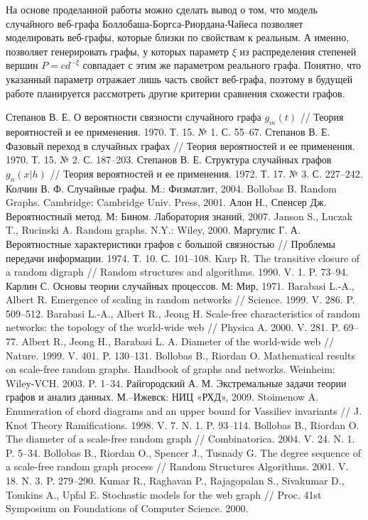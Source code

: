 \documentclass[14pt]{extreport}
\begin{document}
На основе проделанной работы можно сделать вывод о том, что модель случайного веб-графа Боллобаша-Боргса-Риордана-Чайеса позволяет моделировать веб-графы, которые близки по свойствам к реальным. А именно, позволяет генерировать графы, у которых параметр $\xi$ из распределения степеней вершин $P = c d^{-\xi}$ совпадает с этим же параметром реального графа. Понятно, что указанный параметр отражает лишь часть свойст веб-графа, поэтому в будущей работе планируется рассмотреть другие критерии сравнения схожести графов.


\begin{thebibliography}{9}

\bibitem{}
Степанов В. Е. О вероятности связности случайного графа $g_m(t)$ // Теория вероятностей и ее применения. 1970. Т. 15. № 1. С. 55–67.
\bibitem{}
Степанов В. Е. Фазовый переход в случайных графах // Теория вероятностей и ее применения. 1970. Т. 15. № 2. С. 187–203.
\bibitem{}
Степанов В. Е. Структура случайных графов $g_n(x|h)$ // Теория вероятностей и ее применения. 1972. Т. 17. № 3. С. 227–242.
\bibitem{}
Колчин В. Ф. Случайные графы. М.: Физматлит, 2004.
\bibitem{}
Bollobas B. Random Graphs. Cambridge: Cambridge Univ. Press, 2001.
\bibitem{}
Алон Н., Спенсер Дж. Вероятностный метод. М: Бином. Лаборатория знаний, 2007.
\bibitem{}
Janson S., Luczak T., Rucinski A. Random graphs. N.Y.: Wiley, 2000.
\bibitem{}
Маргулис Г. А. Вероятностные характеристики графов с большой связностью // Проблемы передачи информации. 1974. Т. 10. С. 101–108.
\bibitem{}
Karp R. The transitive closure of a random digraph // Random structures and algorithms. 1990. V. 1. P. 73–94.
\bibitem{}
Карлин С. Основы теории случайных процессов. М: Мир, 1971.
\bibitem{}
Barabasi L.-A., Albert R. Emergence of scaling in random networks // Science. 1999. V. 286. P. 509–512.
\bibitem{}
Barabasi L.-A., Albert R., Jeong H. Scale-free characteristics of random networks: the topology of the world-wide web // Physica A. 2000. V. 281. P. 69–77.
\bibitem{}
Albert R., Jeong H., Barabasi L. A. Diameter of the world-wide web // Nature. 1999. V. 401. P. 130–131.
\bibitem{}
Bollobas B., Riordan O. Mathematical results on scale-free random graphs. Handbook of graphs and networks. Weinheim: Wiley-VCH. 2003. P. 1–34.
\bibitem{}
Райгородский А. М. Экстремальные задачи теории графов и анализ данных. М.–Ижевск: НИЦ «РХД», 2009.
\bibitem{}
Stoimenow A. Enumeration of chord diagrams and an upper bound for Vassiliev invariants // J. Knot Theory Ramifications. 1998. V. 7. N. 1. P. 93–114.
\bibitem{}
Bollobas B., Riordan O. The diameter of a scale-free random graph // Combinatorica. 2004. V. 24. N. 1. P. 5–34.
\bibitem{}
Bollobas B., Riordan O., Spencer J., Tusnady G. The degree sequence of a scale-free random graph process // Random Structures Algorithms. 2001. V. 18. N. 3. P. 279–290.
\bibitem{}
Kumar R., Raghavan P., Rajagopalan S., Sivakumar D., Tomkins A., Upfal E. Stochastic models for the web graph // Proc. 41st Symposium on Foundations of Computer Science. 2000.

\end{thebibliography}
\newpage
\end{document}
